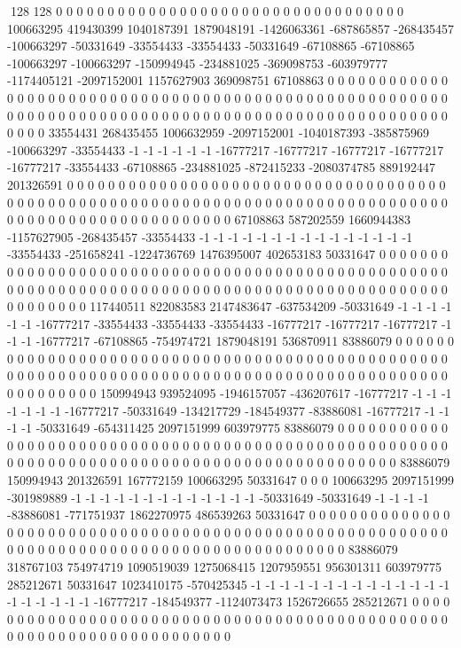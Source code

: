 128 128
0 0 0 0 0 0 0 0 0 0 0 0 0 0 0 0 0 0 0 0 0 0 0 0 0 0 0 0 0 0 0 0 0 0 100663295 419430399 1040187391 1879048191 -1426063361 -687865857 -268435457 -100663297 -50331649 -33554433 -33554433 -50331649 -67108865 -67108865 -100663297 -100663297 -150994945 -234881025 -369098753 -603979777 -1174405121 -2097152001 1157627903 369098751 67108863 0 0 0 0 0 0 0 0 0 0 0 0 0 0 0 0 0 0 0 0 0 0 0 0 0 0 0 0 0 0 0 0 0 0 0 0 0 0 0 0 0 0 0 0 0 0 0 0 0 0 0 0 0 0 0 0 0 0 0 0 0 0 0 0 0 0 0 0 0
0 0 0 0 0 0 0 0 0 0 0 0 0 0 0 0 0 0 0 0 0 0 0 0 0 0 0 0 0 0 0 0 0 33554431 268435455 1006632959 -2097152001 -1040187393 -385875969 -100663297 -33554433 -1 -1 -1 -1 -1 -1 -16777217 -16777217 -16777217 -16777217 -16777217 -33554433 -67108865 -234881025 -872415233 -2080374785 889192447 201326591 0 0 0 0 0 0 0 0 0 0 0 0 0 0 0 0 0 0 0 0 0 0 0 0 0 0 0 0 0 0 0 0 0 0 0 0 0 0 0 0 0 0 0 0 0 0 0 0 0 0 0 0 0 0 0 0 0 0 0 0 0 0 0 0 0 0 0 0 0
0 0 0 0 0 0 0 0 0 0 0 0 0 0 0 0 0 0 0 0 0 0 0 0 0 0 0 0 0 0 0 0 0 67108863 587202559 1660944383 -1157627905 -268435457 -33554433 -1 -1 -1 -1 -1 -1 -1 -1 -1 -1 -1 -1 -1 -1 -1 -33554433 -251658241 -1224736769 1476395007 402653183 50331647 0 0 0 0 0 0 0 0 0 0 0 0 0 0 0 0 0 0 0 0 0 0 0 0 0 0 0 0 0 0 0 0 0 0 0 0 0 0 0 0 0 0 0 0 0 0 0 0 0 0 0 0 0 0 0 0 0 0 0 0 0 0 0 0 0 0 0 0
0 0 0 0 0 0 0 0 0 0 0 0 0 0 0 0 0 0 0 0 0 0 0 0 0 0 0 0 0 0 0 0 0 117440511 822083583 2147483647 -637534209 -50331649 -1 -1 -1 -1 -1 -1 -16777217 -33554433 -33554433 -33554433 -16777217 -16777217 -16777217 -1 -1 -1 -16777217 -67108865 -754974721 1879048191 536870911 83886079 0 0 0 0 0 0 0 0 0 0 0 0 0 0 0 0 0 0 0 0 0 0 0 0 0 0 0 0 0 0 0 0 0 0 0 0 0 0 0 0 0 0 0 0 0 0 0 0 0 0 0 0 0 0 0 0 0 0 0 0 0 0 0 0 0 0 0 0
0 0 0 0 0 0 0 0 0 0 0 0 0 0 0 0 0 0 0 0 0 0 0 0 0 0 0 0 0 0 0 0 0 150994943 939524095 -1946157057 -436207617 -16777217 -1 -1 -1 -1 -1 -1 -1 -16777217 -50331649 -134217729 -184549377 -83886081 -16777217 -1 -1 -1 -1 -50331649 -654311425 2097151999 603979775 83886079 0 0 0 0 0 0 0 0 0 0 0 0 0 0 0 0 0 0 0 0 0 0 0 0 0 0 0 0 0 0 0 0 0 0 0 0 0 0 0 0 0 0 0 0 0 0 0 0 0 0 0 0 0 0 0 0 0 0 0 0 0 0 0 0 0 0 0 0
0 0 0 0 0 0 0 0 0 0 0 0 0 0 0 0 0 0 0 0 0 0 0 0 83886079 150994943 201326591 167772159 100663295 50331647 0 0 0 100663295 2097151999 -301989889 -1 -1 -1 -1 -1 -1 -1 -1 -1 -1 -1 -1 -1 -50331649 -50331649 -1 -1 -1 -1 -83886081 -771751937 1862270975 486539263 50331647 0 0 0 0 0 0 0 0 0 0 0 0 0 0 0 0 0 0 0 0 0 0 0 0 0 0 0 0 0 0 0 0 0 0 0 0 0 0 0 0 0 0 0 0 0 0 0 0 0 0 0 0 0 0 0 0 0 0 0 0 0 0 0 0 0 0 0 0
0 0 0 0 0 0 0 0 0 0 0 0 0 0 0 0 0 0 0 0 0 0 83886079 318767103 754974719 1090519039 1275068415 1207959551 956301311 603979775 285212671 50331647 1023410175 -570425345 -1 -1 -1 -1 -1 -1 -1 -1 -1 -1 -1 -1 -1 -1 -1 -1 -1 -1 -1 -1 -16777217 -184549377 -1124073473 1526726655 285212671 0 0 0 0 0 0 0 0 0 0 0 0 0 0 0 0 0 0 0 0 0 0 0 0 0 0 0 0 0 0 0 0 0 0 0 0 0 0 0 0 0 0 0 0 0 0 0 0 0 0 0 0 0 0 0 0 0 0 0 0 0 0 0 0 0 0 0 0 0
